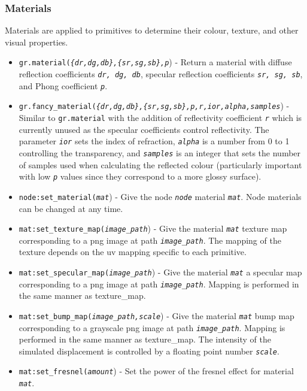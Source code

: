 \documentclass[12pt]{article}
\begin{document}
\subsubsection{Materials}

Materials are applied to primitives to determine their colour, texture, and other visual properties.
\begin{itemize} \itemsep1pt \parskip0pt 
\item{\texttt{gr.material(\textit{\{dr,dg,db\},\{sr,sg,sb\},p}}) - Return a material with diffuse reflection coefficients \textit{\texttt{dr, dg, db}}, specular reflection coefficients \textit{\texttt{sr, sg, sb}}, and Phong coefficient \textit{\texttt{p}}.}
\item{\texttt{gr.fancy\_material(\textit{\{dr,dg,db\},\{sr,sg,sb\},p,r,ior,alpha,samples}}) - Similar to \texttt{gr.material} with the addition of reflectivity coefficient \textit{\texttt{r}} which is currently unused as the specular coefficients control reflectivity. The parameter \textit{\texttt{ior}} sets the index of refraction, \textit{\texttt{alpha}} is a number from 0 to 1 controlling the transparency, and \textit{\texttt{samples}} is an integer that sets the number of samples used when calculating the reflected colour (particularly important with low \textit{\texttt{p}} values since they correspond to a more glossy surface).}
\item{\texttt{node:set\_material(\textit{mat}}) - Give the node \textit{\texttt{node}} material \textit{\texttt{mat}}. Node materials can be changed at any time.}
\item{\texttt{mat:set\_texture\_map(\textit{image\_path}}) - Give the material \textit{\texttt{mat}} texture map corresponding to a png image at path \textit{\texttt{image\_path}}. The mapping of the texture depends on the uv mapping specific to each primitive.}
\item{\texttt{mat:set\_specular\_map(\textit{image\_path}}) - Give the material \textit{\texttt{mat}} a specular map corresponding to a png image at path \textit{\texttt{image\_path}}. Mapping is performed in the same manner as texture\_map.}
\item{\texttt{mat:set\_bump\_map(\textit{image\_path,scale}}) - Give the material \textit{\texttt{mat}} bump map corresponding to a grayscale png image at path \textit{\texttt{image\_path}}. Mapping is performed in the same manner as texture\_map. The intensity of the simulated displacement is controlled by a floating point number \textit{\texttt{scale}}.}
\item{\texttt{mat:set\_fresnel(\textit{amount}}) - Set the power of the fresnel effect for material \textit{\texttt{mat}}.}
\end{itemize}
\end{document}
